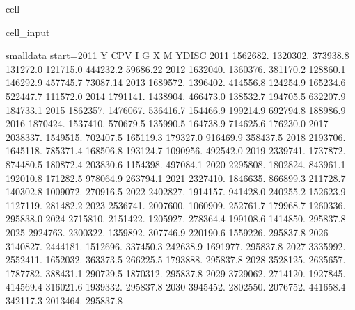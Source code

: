 \documentclass[letterpaper,10pt,english]{jupyterBook}
\begin{document}
\begin{sphinxuseclass}{cell}\begin{sphinxVerbatimInput}

\begin{sphinxuseclass}{cell_input}
\begin{sphinxVerbatim}[commandchars=\\\{\}]
 smalldata start=2011
Y CPV I G X M YDISC
2011 1562682. 1320302. 373938.8 131272.0 121715.0 444232.2 59686.22
2012 1632040. 1360376. 381170.2 128860.1 146292.9 457745.7 73087.14
2013 1689572. 1396402. 414556.8 124254.9 165234.6 522447.7 111572.0
2014 1791141. 1438904. 466473.0 138532.7 194705.5 632207.9 184733.1
2015 1862357. 1476067. 536416.7 154466.9 199214.9 692794.8 188986.9
2016 1870424. 1537410. 570679.5 135990.5 164738.9 714625.6 176230.0
2017 2038337. 1549515. 702407.5 165119.3 179327.0 916469.9 358437.5
2018 2193706. 1645118. 785371.4 168506.8 193124.7 1090956. 492542.0
2019 2339741. 1737872. 874480.5 180872.4 203830.6 1154398. 497084.1
2020 2295808. 1802824. 843961.1 192010.8 171282.5 978064.9 263794.1
2021 2327410. 1846635. 866899.3 211728.7 140302.8 1009072. 270916.5
2022 2402827. 1914157. 941428.0 240255.2 152623.9 1127119. 281482.2
2023 2536741. 2007600. 1060909. 252761.7 179968.7 1260336. 295838.0
2024 2715810. 2151422. 1205927. 278364.4 199108.6 1414850. 295837.8
2025 2924763. 2300322. 1359892. 307746.9 220190.6 1559226. 295837.8
2026 3140827. 2444181. 1512696. 337450.3 242638.9 1691977. 295837.8
2027 3335992. 2552411. 1652032. 363373.5 266225.5 1793888. 295837.8
2028 3528125. 2635657. 1787782. 388431.1 290729.5 1870312. 295837.8
2029 3729062. 2714120. 1927845. 414569.4 316021.6 1939332. 295837.8
2030 3945452. 2802550. 2076752. 441658.4 342117.3 2013464. 295837.8
\end{sphinxVerbatim}

\end{sphinxuseclass}\end{sphinxVerbatimInput}

\end{sphinxuseclass}
\end{document}

